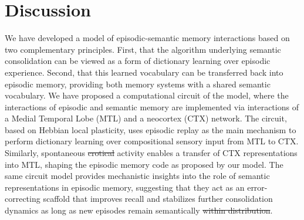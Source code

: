 \documentclass{article}
\providecommand{\DIFaddtex}[1]{{\protect\color{blue}\uwave{#1}}} %
\providecommand{\DIFdeltex}[1]{{\protect\color{red}\sout{#1}}}                      %
\providecommand{\DIFaddbegin}{} %
\providecommand{\DIFaddend}{} %
\providecommand{\DIFdelbegin}{} %
\providecommand{\DIFdelend}{} %
\providecommand{\DIFadd}[1]{\texorpdfstring{\DIFaddtex{#1}}{#1}} %
\providecommand{\DIFdel}[1]{\texorpdfstring{\DIFdeltex{#1}}{}} %
\begin{document}
\section*{Discussion}
We have developed a model of episodic-semantic memory interactions based on two complementary principles. First, that the algorithm underlying semantic consolidation can be viewed as a form of dictionary learning over episodic experience. Second, that this learned vocabulary can be transferred back into episodic memory, providing both memory systems with a shared semantic vocabulary. We have proposed a computational circuit of the model, where the interactions of episodic and semantic memory are implemented via interactions of a Medial Temporal Lobe (MTL) and a neocortex (CTX) network. The circuit, based on Hebbian local plasticity, uses episodic replay as the main mechanism to perform dictionary learning over compositional sensory input from MTL to CTX. Similarly, spontaneous \DIFdelbegin \DIFdel{crotical }\DIFdelend \DIFaddbegin \DIFadd{cortical }\DIFaddend activity enables a transfer of CTX representations into MTL, shaping the episodic memory code as proposed by our model. The same circuit model provides mechanistic insights into the role of semantic representations in episodic memory, suggesting that they act as an error-correcting scaffold that improves recall and stabilizes further consolidation dynamics as long as new episodes remain semantically \DIFdelbegin \DIFdel{within distribution}\DIFdelend \DIFaddbegin \DIFadd{in-distribution}\DIFaddend .
\newline\newline
\end{document}
